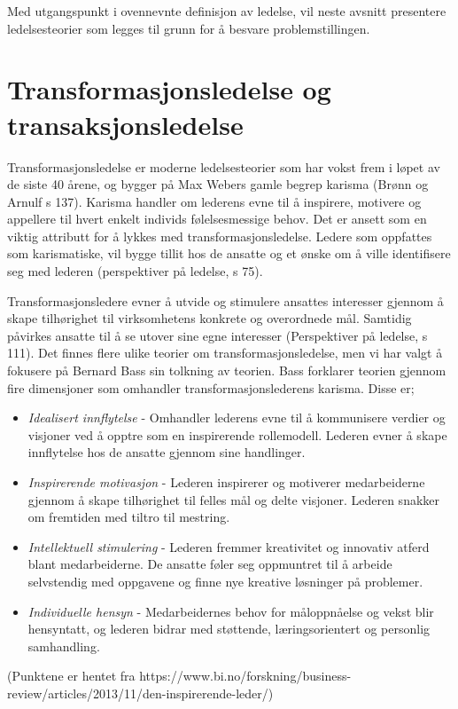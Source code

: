 \indent \newline
Med utgangspunkt i ovennevnte definisjon av ledelse, vil neste avsnitt presentere ledelsesteorier som legges til grunn for å besvare problemstillingen. 

\section{Transformasjonsledelse og transaksjonsledelse}
Transformasjonsledelse er moderne ledelsesteorier som har vokst frem i løpet av de siste 40 årene, og bygger på Max Webers gamle begrep karisma (Brønn og Arnulf s 137). Karisma handler om lederens evne til å inspirere, motivere og appellere til hvert enkelt individs følelsesmessige behov. Det er ansett som en viktig attributt for å lykkes med transformasjonsledelse. Ledere som oppfattes som karismatiske, vil bygge tillit hos de ansatte og et ønske om å ville identifisere seg med lederen (perspektiver på ledelse, s 75).

\indent \newline
Transformasjonsledere evner å utvide og stimulere ansattes interesser gjennom å skape tilhørighet til virksomhetens konkrete og overordnede mål. Samtidig påvirkes ansatte til å se utover sine egne interesser (Perspektiver på ledelse, s 111). Det finnes flere ulike teorier om transformasjonsledelse, men vi har valgt å fokusere på Bernard Bass sin tolkning av teorien. Bass forklarer teorien gjennom fire dimensjoner som omhandler transformasjonslederens karisma. Disse er;

\begin{itemize}
\item\textit{Idealisert innflytelse} - Omhandler lederens evne til å kommunisere verdier og visjoner ved å opptre som en inspirerende rollemodell. Lederen evner å skape innflytelse hos de ansatte gjennom sine handlinger.
\item\textit{Inspirerende motivasjon} - Lederen inspirerer og motiverer medarbeiderne gjennom å skape tilhørighet til felles mål og delte visjoner. Lederen snakker om fremtiden med tiltro til mestring.
\item\textit{Intellektuell stimulering} - Lederen fremmer kreativitet og innovativ atferd blant medarbeiderne. De ansatte føler seg oppmuntret til å arbeide selvstendig med oppgavene og finne nye kreative løsninger på problemer.
\item\textit{Individuelle hensyn} - Medarbeidernes behov for måloppnåelse og vekst blir hensyntatt, og lederen bidrar med støttende, læringsorientert og personlig samhandling.
\end{itemize}
(Punktene er hentet fra https://www.bi.no/forskning/business-review/articles/2013/11/den-inspirerende-leder/)

